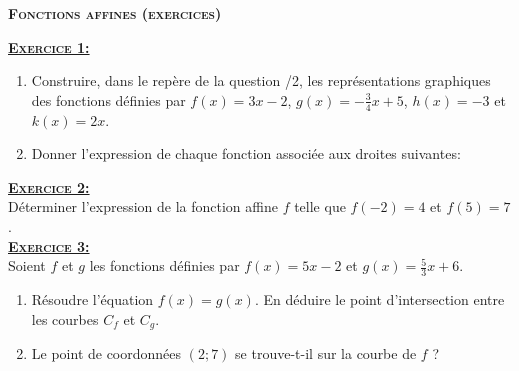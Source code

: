 \documentclass[12pt,a4paper]{article}
\begin{document}
\pagestyle{empty}
\begin{center}{\LARGE \textbf{\textsc{Fonctions affines (exercices)}}}\end{center}

\textbf{\textsc{\underline{Exercice 1:}}}
\begin{enumerate}
\item Construire, dans le repère de la question /2, les représentations graphiques des fonctions définies par $f(x)=3x-2$, $g(x)=-\frac{3}{4}x+5$, $h(x)=-3$ et $k(x)=2x$.
\item Donner l'expression de chaque fonction associée aux droites suivantes:\\

\end{enumerate}
\vspace{0,5cm}
\textbf{\textsc{\underline{Exercice 2:}}}\medskip\\
Déterminer l'expression de la fonction affine $f$ telle que $f(-2)=4$ et $f(5)=7$.\\

\textbf{\textsc{\underline{Exercice 3:}}}\medskip\\
Soient $f$ et $g$ les fonctions définies par $f(x)=5x-2$ et $g(x)=\frac{5}{3}x+6$.\medskip
\begin{enumerate}
\item Résoudre l'équation $f(x)=g(x)$. En déduire le point d'intersection entre les courbes $C_{f}$ et $C_{g}$.\medskip
\item Le point de coordonnées $(2;7)$ se trouve-t-il sur la courbe de $f$ ?\medskip 
\end{enumerate}
\end{document}
